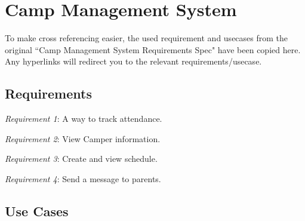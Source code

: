 \documentclass[11pt]{article}
\begin{document}
\clearpage



\appendix
\section{Camp Management System}\label{appendix:camp_sys}
To make cross referencing easier, the used requirement and usecases from the original ``Camp Management System Requirements Spec" have been copied here. Any hyperlinks will redirect you to the relevant requirements/usecase.

\subsection{Requirements}

\noindent\textit{\hypertarget{Req1}{Requirement 1}}: A way to track attendance.\vspace{0.5em}

\noindent\textit{\hypertarget{Req2}{Requirement 2}}: View Camper information.\vspace{0.5em}

\noindent\textit{\hypertarget{Req3}{Requirement 3}}: Create and view schedule.\vspace{0.5em}

\noindent\textit{\hypertarget{Req4}{Requirement 4}}: Send a message to parents.\vspace{0.5em}

\subsection{Use Cases}
\end{document}
